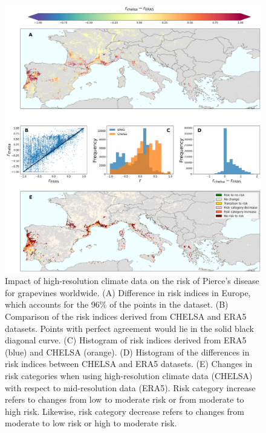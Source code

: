\begin{figure}[H]
    \centering

    \includegraphics[width=\textwidth]{Figures/risk_difference_vineyards.pdf}
    \caption[Impact of high-resolution climate data on the risk of Pierce's
        disease for grapevines worldwide]{Impact of high-resolution climate
        data on the risk of Pierce's disease for grapevines worldwide. (A)
        Difference in risk indices in Europe, which accounts for the 96\% of
        the points in the dataset. (B) Comparison of the risk indices derived
        from CHELSA and ERA5 datasets. Points with perfect agreement would lie
        in the solid black diagonal curve. (C) Histogram of risk indices
        derived from ERA5 (blue) and CHELSA (orange). (D) Histogram of the
        differences in risk indices between CHELSA and ERA5 datasets. (E)
        Changes in risk categories when using high-resolution climate data
        (CHELSA) with respect to mid-resolution data (ERA5). Risk category
        increase refers to changes from low to moderate risk or from moderate
        to high risk. Likewise, risk category decrease refers to changes from
        moderate to low risk or high to moderate risk.}
    \label{fig:risk_dif_vid}
\end{figure}

